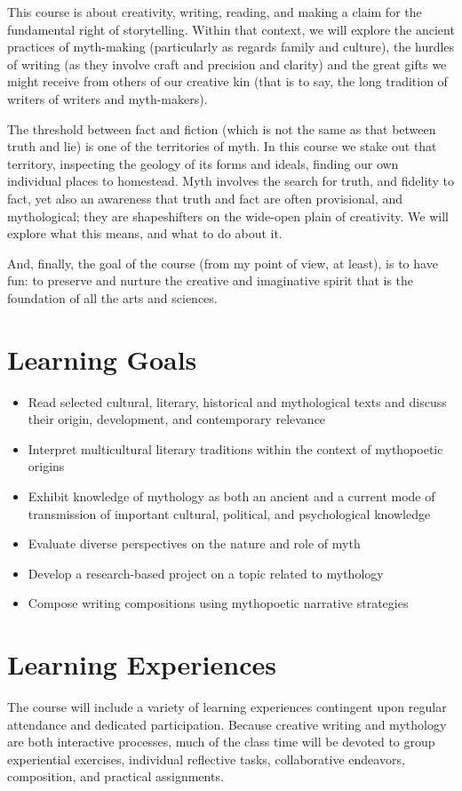 \documentclass[letterpaper,10pt,headsepline]{scrreprt}
\begin{document}
This course is about creativity, writing, reading, and making a claim for the fundamental right of storytelling. Within that context, we will
explore the ancient practices of myth-making (particularly as regards family and culture), the hurdles of writing (as they involve craft and
precision and clarity) and the great gifts we might receive from others of our creative kin (that is to say, the long tradition of writers of writers and myth-makers).

The threshold between fact and fiction (which is not the same as that between truth and lie) is one of the territories of myth. In this course we stake out that territory, inspecting the geology of its forms and ideals, finding our own individual places to homestead. Myth involves the search for truth, and fidelity to fact, yet also an awareness that truth and fact are often provisional, and mythological; they are shapeshifters on the wide-open plain of creativity. We will explore what this means, and what to do about it.

And, finally, the goal of the course (from my point of view, at least), is to have fun: to preserve and nurture the creative and imaginative spirit that is the foundation of all the arts and sciences.

\section{Learning Goals}
\begin{itemize}

\item Read selected cultural, literary, historical and mythological texts and discuss their origin, development, and contemporary relevance
\item Interpret multicultural literary traditions within the context of mythopoetic origins
\item Exhibit knowledge of mythology as both an ancient and a current mode of transmission of important cultural, political, and psychological knowledge
\item Evaluate diverse perspectives on the nature and role of myth
\item Develop a research-based project on a topic related to mythology
\item Compose writing compositions using mythopoetic narrative strategies

\end{itemize}

\section{Learning Experiences}
The course will include a variety of learning experiences contingent upon regular attendance and dedicated participation. Because creative writing and mythology are both interactive processes, much of the class time will be devoted to group experiential exercises, individual reflective tasks, collaborative endeavors, composition, and practical assignments.
\end{document}
